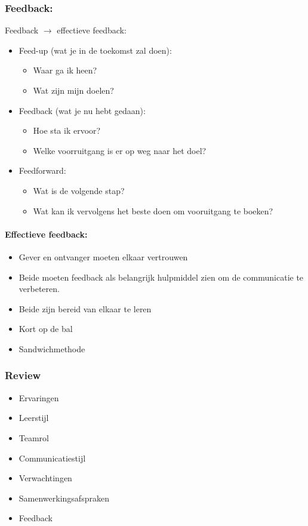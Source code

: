 \documentclass[12pt]{article}
\begin{document}
\subsubsection{Feedback:}
Feedback $\rightarrow$ effectieve feedback:\begin{itemize}
    \item Feed-up (wat je in de toekomst zal doen):\begin{itemize}
        \item Waar ga ik heen?
        \item Wat zijn mijn doelen?
    \end{itemize}
    \item Feedback (wat je nu hebt gedaan):\begin{itemize}
        \item Hoe sta ik ervoor?
        \item Welke voorruitgang is er op weg naar het doel?
    \end{itemize}
    \item Feedforward:\begin{itemize}
        \item Wat is de volgende stap?
        \item Wat kan ik vervolgens het beste doen om vooruitgang te boeken?
    \end{itemize}
\end{itemize}
\paragraph{Effectieve feedback:}\begin{itemize}
    \item Gever en ontvanger moeten elkaar vertrouwen
    \item Beide moeten feedback als belangrijk hulpmiddel zien om de communicatie te verbeteren.
    \item Beide zijn bereid van elkaar te leren 
    \item Kort op de bal 
    \item Sandwichmethode
\end{itemize}
\subsubsection{Review}\begin{itemize}
    \item Ervaringen 
    \item Leerstijl 
    \item Teamrol 
    \item Communicatiestijl 
    \item Verwachtingen 
    \item Samenwerkingsafspraken 
    \item Feedback 
\end{itemize}
\end{document}
